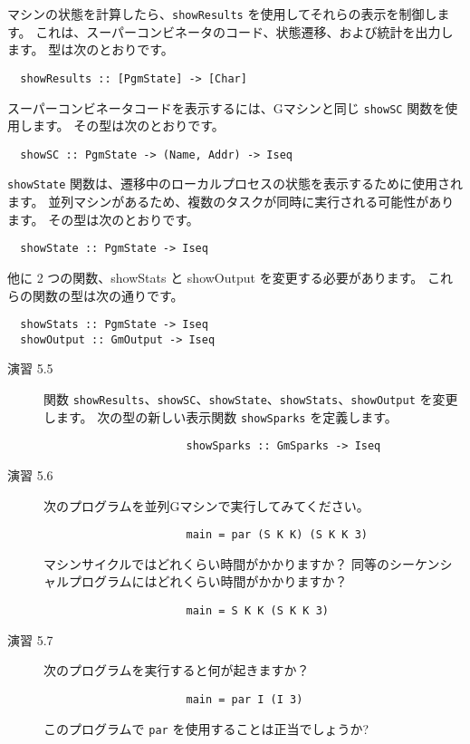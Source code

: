 \documentclass{jarticle}
\begin{document}
マシンの状態を計算したら、\texttt{showResults} を使用してそれらの表示を制御します。
これは、スーパーコンビネータのコード、状態遷移、および統計を出力します。
型は次のとおりです。

\begin{verbatim}
  showResults :: [PgmState] -> [Char]
\end{verbatim}
\newpage

スーパーコンビネータコードを表示するには、Gマシンと同じ \texttt{showSC} 関数を使用します。
その型は次のとおりです。

\begin{verbatim}
  showSC :: PgmState -> (Name, Addr) -> Iseq
\end{verbatim}

\texttt{showState} 関数は、遷移中のローカルプロセスの状態を表示するために使用されます。
並列マシンがあるため、複数のタスクが同時に実行される可能性があります。
その型は次のとおりです。

\begin{verbatim}
  showState :: PgmState -> Iseq
\end{verbatim}

他に 2 つの関数、showStats と showOutput を変更する必要があります。
これらの関数の型は次の通りです。

\begin{verbatim}
  showStats :: PgmState -> Iseq
  showOutput :: GmOutput -> Iseq
\end{verbatim}

\begin{description}
	\item[演習 5.5] 関数 \texttt{showResults}、\texttt{showSC}、\texttt{showState}、\texttt{showStats}、\texttt{showOutput} を変更します。
		次の型の新しい表示関数 \texttt{showSparks} を定義します。
		\begin{verbatim}
					  showSparks :: GmSparks -> Iseq
					\end{verbatim}
	\item[演習 5.6] 次のプログラムを並列Gマシンで実行してみてください。
		\begin{verbatim}
					  main = par (S K K) (S K K 3)
                    \end{verbatim}
		マシンサイクルではどれくらい時間がかかりますか？
		同等のシーケンシャルプログラムにはどれくらい時間がかかりますか？
		\begin{verbatim}
					  main = S K K (S K K 3)
					\end{verbatim}
	\item[演習 5.7] 次のプログラムを実行すると何が起きますか？
		\begin{verbatim}
					  main = par I (I 3)
                    \end{verbatim}
		このプログラムで \texttt{par} を使用することは正当でしょうか?
\end{description}
\end{document}
